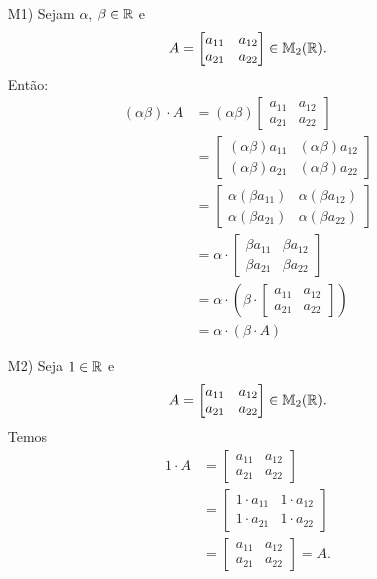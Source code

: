 \documentclass[12pt]{exam}
\begin{document}
\begin{itemize}
        \item[M1)] Sejam $\alpha$, $\beta \in \mathbb{R}$ e
        \[
        A = \begin{bmatrix} a_{11} & a_{12}\\a_{21} & a_{22}\end{bmatrix} \in \mathbb{M}_{2}(\mathbb{R}).
        \]
        Então:
        \begin{align*}
            (\alpha\beta)\cdot A & = (\alpha\beta)\begin{bmatrix} a_{11} & a_{12}\\a_{21} & a_{22}\end{bmatrix}
            \\ &= \begin{bmatrix} (\alpha\beta)a_{11} & (\alpha\beta)a_{12}\\(\alpha\beta)a_{21} & (\alpha\beta)a_{22}\end{bmatrix}
            \\ &= \begin{bmatrix} \alpha(\beta a_{11}) & \alpha(\beta a_{12})\\\alpha(\beta a_{21}) & \alpha(\beta a_{22})\end{bmatrix}
            \\ &= \alpha\cdot\begin{bmatrix} \beta a_{11} & \beta a_{12}\\\beta a_{21} & \beta a_{22}\end{bmatrix}
            \\ &= \alpha\cdot\left(\beta\cdot\begin{bmatrix} a_{11} & a_{12}\\a_{21} & a_{22}\end{bmatrix}\right)
            \\ &= \alpha\cdot(\beta\cdot A)
        \end{align*}

        \item[M2)] Seja $1 \in \mathbb{R}$ e
        \[
        A = \begin{bmatrix} a_{11} & a_{12}\\a_{21} & a_{22}\end{bmatrix} \in \mathbb{M}_{2}(\mathbb{R}).
        \]
        Temos
        \begin{align*}
            1\cdot A & = \begin{bmatrix} a_{11} & a_{12}\\a_{21} & a_{22}\end{bmatrix}
            \\ &= \begin{bmatrix} 1\cdot a_{11} & 1\cdot a_{12}\\1\cdot a_{21} & 1\cdot a_{22}\end{bmatrix}
            \\ &= \begin{bmatrix} a_{11} & a_{12}\\a_{21} & a_{22}\end{bmatrix} = A.
        \end{align*}


\end{itemize}
\end{document}

